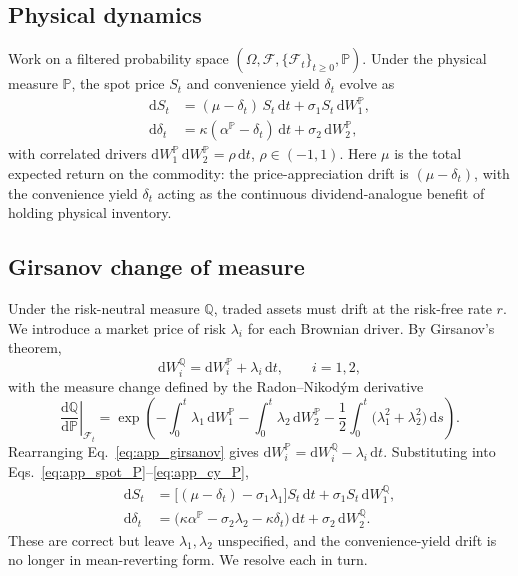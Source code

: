 \documentclass[11pt, a4paper]{article}
\newcommand{\convyield}{\delta}             %
\newcommand{\meanrev}{\kappa}               %
\newcommand{\longrun}{\alpha}               %
\begin{document}
\subsection{Physical dynamics}

Work on a filtered probability space $(\Omega, \mathcal{F}, \{\mathcal{F}_t\}_{t\geq 0}, \mathbb{P})$. Under the physical measure $\mathbb{P}$, the spot price $S_t$ and convenience yield $\convyield_t$ evolve as
\begin{align}
  \label{eq:app_spot_P}
  \mathrm{d}S_t &= (\mu - \convyield_t)\,S_t\,\mathrm{d}t + \sigma_1 S_t\,\mathrm{d}W_1^{\mathbb{P}}, \\
  \label{eq:app_cy_P}
  \mathrm{d}\convyield_t &= \meanrev(\longrun^{\mathbb{P}} - \convyield_t)\,\mathrm{d}t + \sigma_2\,\mathrm{d}W_2^{\mathbb{P}},
\end{align}
\noindent
with correlated drivers $\mathrm{d}W_1^{\mathbb{P}}\,\mathrm{d}W_2^{\mathbb{P}} = \rho\,\mathrm{d}t$, $\rho \in (-1, 1)$. Here $\mu$ is the total expected return on the commodity: the price-appreciation drift is $(\mu - \convyield_t)$, with the convenience yield $\convyield_t$ acting as the continuous dividend-analogue benefit of holding physical inventory.

\subsection{Girsanov change of measure}

Under the risk-neutral measure $\mathbb{Q}$, traded assets must drift at the risk-free rate $r$. We introduce a market price of risk $\lambda_i$ for each Brownian driver. By Girsanov's theorem,
\begin{equation}
  \label{eq:app_girsanov}
  \mathrm{d}W_i^{\mathbb{Q}} = \mathrm{d}W_i^{\mathbb{P}} + \lambda_i\,\mathrm{d}t, \qquad i = 1, 2,
\end{equation}
\noindent
with the measure change defined by the Radon--Nikod\'ym derivative
\begin{equation}
  \label{eq:app_rn}
  \left.\frac{\mathrm{d}\mathbb{Q}}{\mathrm{d}\mathbb{P}}\right|_{\mathcal{F}_t}
  = \exp\!\left(
    -\int_0^t \lambda_1\,\mathrm{d}W_1^{\mathbb{P}}
    -\int_0^t \lambda_2\,\mathrm{d}W_2^{\mathbb{P}}
    -\frac{1}{2}\int_0^t \big(\lambda_1^2 + \lambda_2^2\big)\,\mathrm{d}s
  \right).
\end{equation}
\noindent
Rearranging Eq.~\ref{eq:app_girsanov} gives $\mathrm{d}W_i^{\mathbb{P}} = \mathrm{d}W_i^{\mathbb{Q}} - \lambda_i\,\mathrm{d}t$. Substituting into Eqs.~\ref{eq:app_spot_P}--\ref{eq:app_cy_P},
\begin{align}
  \label{eq:app_spot_sub}
  \mathrm{d}S_t &= \big[(\mu - \convyield_t) - \sigma_1\lambda_1\big] S_t\,\mathrm{d}t + \sigma_1 S_t\,\mathrm{d}W_1^{\mathbb{Q}}, \\
  \label{eq:app_cy_sub}
  \mathrm{d}\convyield_t &= \big(\meanrev\longrun^{\mathbb{P}} - \sigma_2\lambda_2 - \meanrev\convyield_t\big)\,\mathrm{d}t + \sigma_2\,\mathrm{d}W_2^{\mathbb{Q}}.
\end{align}
\noindent
These are correct but leave $\lambda_1, \lambda_2$ unspecified, and the convenience-yield drift is no longer in mean-reverting form. We resolve each in turn.
\end{document}
